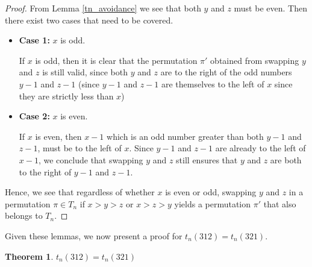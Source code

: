 \documentclass[11pt,letterpaper,twoside,english]{article}
\theoremstyle{theorem}
\newtheorem{theorem}{Theorem}
\theoremstyle{remark}
\begin{document}
\begin{proof}
From Lemma \ref{tn_avoidance} we see that both $y$ and $z$ must be even. Then there exist two cases that need to be covered.
\begin{itemize}
\item \textbf{Case 1:} $x$ is odd.

If $x$ is odd, then it is clear that the permutation $\pi'$ obtained from swapping $y$ and $z$ is still valid, since both $y$ and $z$ are to the right of the odd numbers $y-1$ and $z-1$ (since $y-1$ and $z-1$ are themselves to the left of $x$ since they are strictly less than $x$)

\item \textbf{Case 2:} $x$ is even.

If $x$ is even, then $x-1$ which is an odd number greater than both $y-1$ and $z-1$, must be to the left of $x$. Since $y-1$ and $z-1$ are already to the left of $x-1$, we conclude that swapping $y$ and $z$ still ensures that $y$ and $z$ are both to the right of $y-1$ and $z-1$.
\end{itemize}
Hence, we see that regardless of whether $x$ is even or odd, swapping $y$ and $z$ in a permutation $\pi \in T_n$ if $x > y > z$ or $x > z > y$ yields a permutation $\pi'$ that also belongs to $T_n$.
\end{proof}

Given these lemmas, we now present a proof for $t_n(312) = t_n(321)$.

\begin{theorem}
$t_n(312) = t_n(321)$
\end{theorem}
\end{document}
